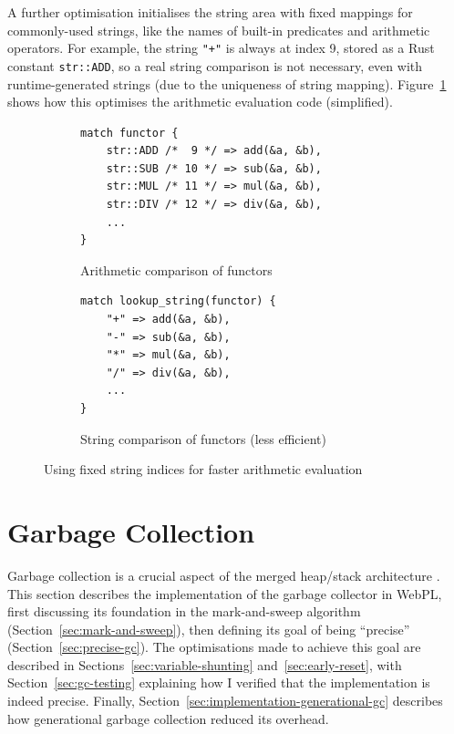 A further optimisation initialises the string area with fixed mappings for commonly-used strings, like the names of built-in predicates and arithmetic operators. For example, the string \texttt{"+"} is always at index 9, stored as a Rust constant \texttt{str::ADD}, so a real string comparison is not necessary, even with runtime-generated strings (due to the uniqueness of string mapping). Figure~\ref{fig:fixed-string-indices} shows how this optimises the arithmetic evaluation code (simplified).

\begin{figure}[H]
\centering
\begin{subfigure}{.5\textwidth}
\centering
\begin{verbatim}
match functor {
    str::ADD /*  9 */ => add(&a, &b),
    str::SUB /* 10 */ => sub(&a, &b),
    str::MUL /* 11 */ => mul(&a, &b),
    str::DIV /* 12 */ => div(&a, &b),
    ...
}
\end{verbatim}
\caption{Arithmetic comparison of functors}
\end{subfigure}%
\begin{subfigure}{.5\textwidth}
\centering
\begin{verbatim}
match lookup_string(functor) {
    "+" => add(&a, &b),
    "-" => sub(&a, &b),
    "*" => mul(&a, &b),
    "/" => div(&a, &b),
    ...
}
\end{verbatim}
\caption{String comparison of functors (less efficient)}
\end{subfigure}
\caption{Using fixed string indices for faster arithmetic evaluation}
\label{fig:fixed-string-indices}
\end{figure}

\newpage

\section{Garbage Collection}

\label{sec:gc-impl}

Garbage collection is a crucial aspect of the merged heap/stack architecture \cite{liEfficientMemoryManagement2000}. This section describes the implementation of the garbage collector in WebPL, first discussing its foundation in the mark-and-sweep algorithm (Section~\ref{sec:mark-and-sweep}), then defining its goal of being ``precise'' (Section~\ref{sec:precise-gc}). The optimisations made to achieve this goal are described in Sections~\ref{sec:variable-shunting} and~\ref{sec:early-reset}, with Section~\ref{sec:gc-testing} explaining how I verified that the implementation is indeed precise. Finally, Section~\ref{sec:implementation-generational-gc} describes how generational garbage collection reduced its overhead.


